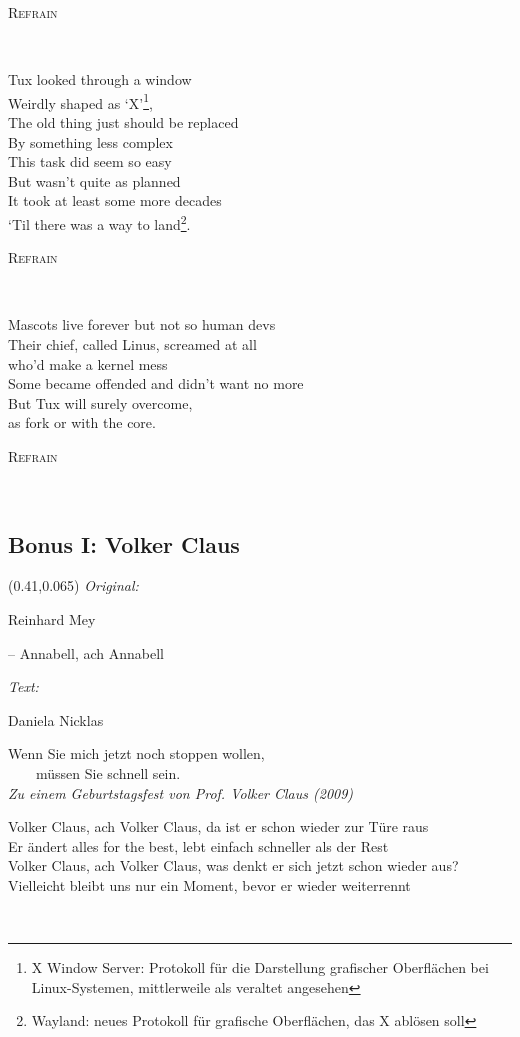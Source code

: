\documentclass[11pt,a5paper]{article}
\makeatletter
\newcommand\chord[2][l]{\makebox[0pt][#1]{\begin{tabular}[b]{@{}l@{}}#2\\\mbox{}\end{tabular}}}
\newcommand\refrain[1]{\begin{tcolorbox}#1\end{tcolorbox} \ }
\newcommand{\refrefrain}{\refrain{\textsc{Refrain}} \ }
\newcommand\songinfo[2]{\begin{textblock}{0.5}(0.41,0.065)
		\footnotesize 
		\hfill \textit{Original:} \ \ \ \ \ \ \ \ \ \ \ \ \ \ \ \ \ \ \ \ 
		
		\hfill #1
		
		\hfill  \textit{Text:} \ \ \ \ \ \ \ \ \ \ \ \ \ \ \ \ \ \ \ \ 
		
		\hfill #2
	\end{textblock}}
\makeatother
\begin{document}
\refrefrain

Tux looked through a window \\
Weirdly shaped as ‘X’\footnote{\scriptsize X Window Server: Protokoll für die Darstellung grafischer Oberflächen bei Linux-Systemen, mittlerweile als veraltet angesehen}, \\
The old thing just should be replaced \\ 
By something less complex \\
This task did seem so easy \\
But wasn’t quite as planned \\
It took at least some more decades \\
‘Til there was a way to land\footnote{\scriptsize Wayland: neues Protokoll für grafische Oberflächen, das X ablösen soll}. \\

\refrefrain

Mascots live forever but not so human devs \\
Their chief, called Linus, screamed at all \\
who’d make a kernel mess \\
Some became offended and didn’t want no more \\
But Tux will surely overcome, \\
as fork or with the core. \\

\refrefrain
	
\pagebreak

\subsection{Bonus I: Volker Claus}
\songinfo{Reinhard Mey 
	
	\hfill -- Annabell, ach Annabell}{Daniela Nicklas}

\glqq Wenn Sie mich jetzt noch stoppen wollen, \\ \ \ \ \ müssen Sie schnell sein.\grqq \\
\textit{Zu einem Geburtstagsfest von Prof. Volker Claus (2009)} \\

\refrain{
\chord{A}Volker Claus, ach Volker Claus, da \chord{h}ist er schon wieder zur Türe raus \\
\chord{E} Er ändert alles for the best, lebt \chord{A}einfach schneller \chord{E}als der Rest \\
\chord{A}Volker Claus, ach Volker Claus, was \chord{h}denkt er sich jetzt schon wieder aus? \\
Viel\chord{E}leicht bleibt uns nur ein Moment, be\chord{A}vor er wieder weiterrennt}
\end{document}
